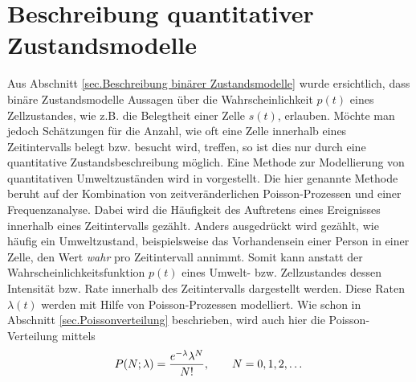 \section{Beschreibung quantitativer Zustandsmodelle}
\label{sec.Beschreibung quantitativer Zustandsmodelle}
Aus Abschnitt \ref{sec.Beschreibung binärer Zustandsmodelle} wurde ersichtlich, dass
binäre Zustandsmodelle Aussagen über die Wahrscheinlichkeit $p(t)$ eines Zellzustandes, wie z.B. die Belegtheit einer Zelle $s(t)$, erlauben. Möchte man jedoch Schätzungen für die Anzahl, wie oft eine Zelle innerhalb eines Zeitintervalls belegt bzw. besucht wird, treffen, so ist dies nur durch eine quantitative Zustandsbeschreibung möglich.
Eine Methode zur Modellierung von quantitativen Umweltzuständen wird in \cite{Jovan.2016} vorgestellt. Die hier genannte Methode beruht auf der Kombination von zeitveränderlichen Poisson-Prozessen und einer Frequenzanalyse. Dabei wird die Häufigkeit des Auftretens eines Ereignisses innerhalb eines Zeitintervalls gezählt. Anders ausgedrückt wird gezählt, wie häufig ein Umweltzustand, beispielsweise das Vorhandensein einer Person in einer Zelle, den Wert \emph{wahr} pro Zeitintervall annimmt. Somit kann anstatt der Wahrscheinlichkeitsfunktion $p(t)$ eines Umwelt- bzw. Zellzustandes dessen Intensität bzw. Rate innerhalb des Zeitintervalls dargestellt werden. Diese Raten $\lambda (t)$ werden mit Hilfe von Poisson-Prozessen modelliert. Wie schon  in Abschnitt \ref{sec.Poissonverteilung} beschrieben, wird auch hier die Poisson-Verteilung mittels
\begin{equation}
	P(N;\lambda) = \frac{e^{\mathrm{-\lambda}} \lambda^N}{N!}, \qquad	N=0,1,2,\dots
\end{equation}

